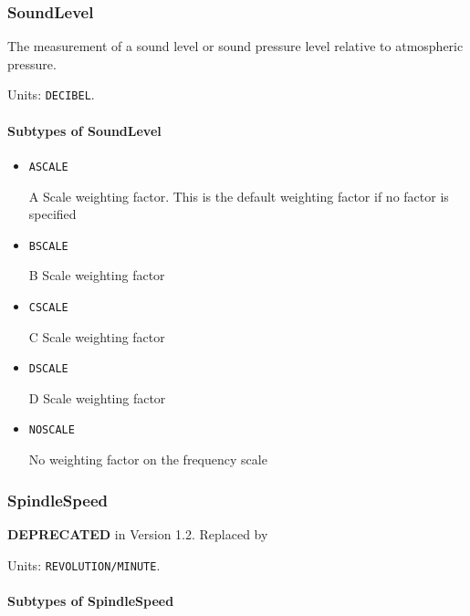 \subsubsection{SoundLevel}
\label{sec:SoundLevel}



The measurement of a sound level or sound pressure level relative to atmospheric pressure.


Units: \texttt{DECIBEL}.

\paragraph{Subtypes of SoundLevel}\mbox{}
\label{sec:Subtypes of SoundLevel}

\begin{itemize}

\item \texttt{A\textunderscore SCALE}


A Scale weighting factor.   This is the default weighting factor if no factor is specified

\item \texttt{B\textunderscore SCALE}


B Scale weighting factor

\item \texttt{C\textunderscore SCALE}


C Scale weighting factor

\item \texttt{D\textunderscore SCALE}


D Scale weighting factor

\item \texttt{NO\textunderscore SCALE}


No weighting factor on the frequency scale


\end{itemize}

\subsubsection{SpindleSpeed}
\label{sec:SpindleSpeed}



\textbf{DEPRECATED} in Version 1.2.  Replaced by 


Units: \texttt{REVOLUTION/MINUTE}.

\paragraph{Subtypes of SpindleSpeed}\mbox{}
\label{sec:Subtypes of SpindleSpeed}


